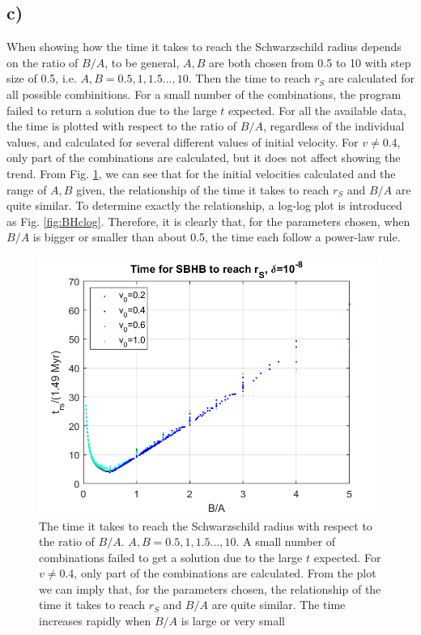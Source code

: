 \documentclass[12pt, graphicx]{article}
\begin{document}
\subsection*{c)}
When showing how the time it takes to reach the Schwarzschild radius depends on the ratio of $B/A$, to be general, $A, B$ are both chosen from 0.5 to 10 with step size of 0.5, i.e. $A, B=0.5, 1, 1.5..., 10$. Then the time to reach $r_S$ are calculated for all possible combinitions. For a small number of the combinations, the program failed to return a solution due to the large $t$ expected. For all the available data, the time is plotted with respect to the ratio of $B/A$, regardless of the individual values, and calculated for several different values of initial velocity. For $v\neq0.4$, only part of the combinations are calculated, but it does not affect showing the trend. From Fig. \ref{fig:BHc}, we can see that for the initial velocities calculated and the range of $A, B$ given, the relationship of the time it takes to reach $r_S$ and $B/A$ are quite similar. To determine exactly the relationship, a log-log plot is introduced as Fig. \ref{fig:BHclog}. Therefore, it is clearly that, for the parameters chosen, when $B/A$ is bigger or smaller than about 0.5, the time each follow a power-law rule. 

\begin{figure}[ht]
\centering
\includegraphics[width = 120mm]{trs.png}
\caption{The time it takes to reach the Schwarzschild radius with respect to the ratio of $B/A$. $A, B=0.5, 1, 1.5..., 10$. A small number of combinations failed to get a solution due to the large $t$ expected. For $v\neq0.4$, only part of the combinations are calculated. From the plot we can imply that, for the parameters chosen, the relationship of the time it takes to reach $r_S$ and $B/A$ are quite similar. The time increases rapidly when $B/A$ is large or very small}
\label{fig:BHc}
\end{figure}
\end{document}
